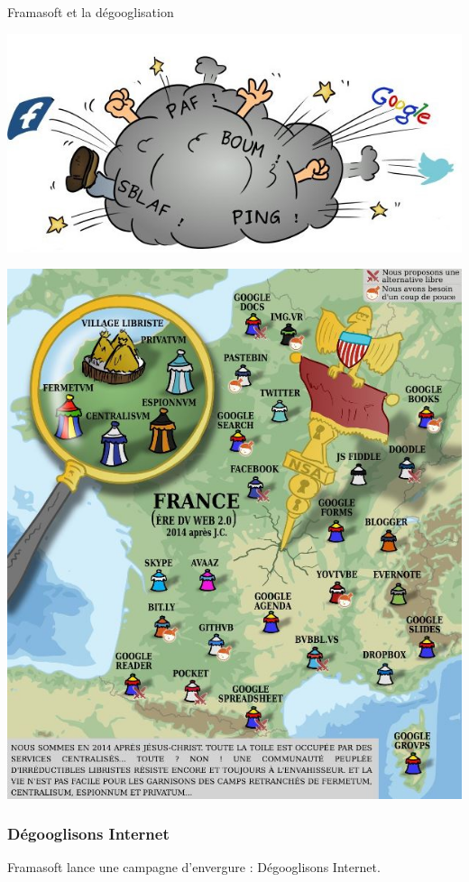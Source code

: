 \documentclass{beamer}
\begin{document}
\begin{frame}
\Huge{\centerline{Framasoft et la dégooglisation}}
\begin{center}
\includegraphics[scale=0.6]{./images/cloud.jpg}
\end{center}
\end{frame}

\begin{frame}
\begin{center}
\includegraphics[scale=0.5]{./images/DegooglisonsInternet.jpg}
\end{center}
\end{frame}
\begin{frame}
\frametitle{Dégooglisons Internet}

\begin{block}{Framasoft lance une campagne d’envergure : Dégooglisons Internet. }
\end{block}
\end{frame}
\end{document}

